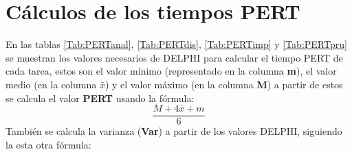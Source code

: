 \documentclass[11pt,a4paper,spanish,twoside]{report}
\begin{document}
\section{Cálculos de los tiempos PERT}
En las tablas \ref{Tab:PERTanal}, \ref{Tab:PERTdis}, \ref{Tab:PERTimp} y
\ref{Tab:PERTpru} se muestran los valores necesarios de DELPHI para calcular
el tiempo PERT de cada tarea, estos son el valor mínimo (representado en la
columna \textbf{m}), el valor medio (en la columna \textbf{$\bar{x}$}) y el
valor máximo (en la columna \textbf{M}) a partir de estos se calcula el valor
\textbf{PERT} usando la fórmula: \begin{displaymath} \frac{M +  
4\overline{x} + m}{6} \end{displaymath} También se calcula la varianza
(\textbf{Var}) a partir de los valores DELPHI, siguiendo la esta otra fórmula:
\end{document}
